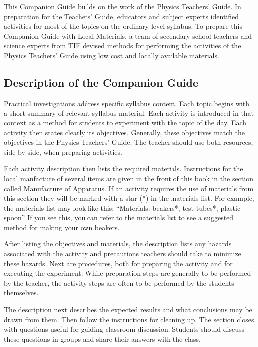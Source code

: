 This Companion Guide builds on the work of the Physics Teachers' Guide. In preparation for the Teachers' Guide, educators and subject experts identified activities for most of the topics on the ordinary level syllabus. To prepare this Companion Guide with Local Materials, a team of secondary school teachers and science experts from TIE devised methods for performing the activities of the Physics Teachers' Guide using low cost and locally available materials.

\subsection*{Description of the Companion Guide}

Practical investigations address specific syllabus content. Each topic begins with a short summary of relevant syllabus material. Each activity is introduced in that context as a method for students to experiment with the topic of the day. Each activity then states clearly its objectives. Generally, these objectives match the objectives in the Physics Teachers' Guide. The teacher should use both resources, side by side, when preparing activities.

Each activity description then lists the required materials. Instructions for the local manfacture of several items are given in the front of this book in the section called Manufacture of Apparatus. If an activity requires the use of materials from this section they will be marked with a star (*) in the materials list. For example, the materials list may look like this:
``Materials: beakers*, test tubes*, plastic spoon''
If you see this, you can refer to the materials list to see a suggested method for making your own beakers.

After listing the objectives and materials, the description lists any hazards associated with the activity and precautions teachers should take to minimize these hazards. Next are procedures, both for preparing the activity and for executing the experiment. While preparation steps are generally to be performed by the teacher, the activity steps are often to be performed by the students themselves.

The description next describes the expected results and what conclusions may be drawn from them. Then follow the instructions for cleaning up. The section closes with questions useful for guiding classroom discussion. Students should discuss these questions in groups and share their answers with the class.

